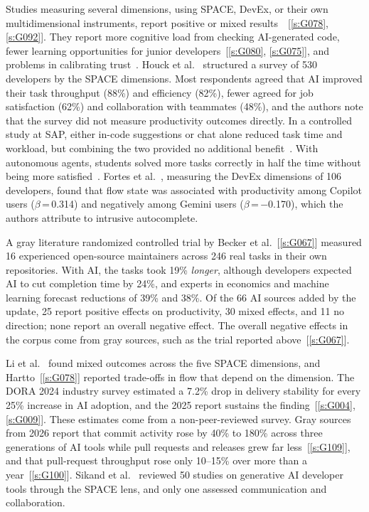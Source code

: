 \documentclass[preprint,number]{elsarticle}
\newcounter{study}
\newcommand{\refG}[1]{\ref{s:#1}}
\begin{document}
Studies measuring several dimensions, using SPACE, DevEx, or their own multidimensional instruments, report positive or mixed results~\cite{P0244, P1303, P1402, P2019, P2020, P2025}~[\refG{G078}, \refG{G092}]. They report more cognitive load from checking AI-generated code, fewer learning opportunities for junior developers~[\refG{G080}, \refG{G075}], and problems in calibrating trust~\cite{P1402}. Houck et al.~\cite{P2020} structured a survey of 530 developers by the SPACE dimensions. Most respondents agreed that AI improved their task throughput (88\%) and efficiency (82\%), fewer agreed for job satisfaction (62\%) and collaboration with teammates (48\%), and the authors note that the survey did not measure productivity outcomes directly. In a controlled study at SAP, either in-code suggestions or chat alone reduced task time and workload, but combining the two provided no additional benefit~\cite{P2019}. With autonomous agents, students solved more tasks correctly in half the time without being more satisfied~\cite{P2025}. Fortes et al.~\cite{P0244}, measuring the DevEx dimensions of 106 developers, found that flow state was associated with productivity among Copilot users ($\beta$\,=\,0.314) and negatively among Gemini users ($\beta$\,=\,$-$0.170), which the authors attribute to intrusive autocomplete.

A gray literature randomized controlled trial by Becker et al.~[\refG{G067}] measured 16 experienced open-source maintainers across 246 real tasks in their own repositories. With AI, the tasks took 19\% \textit{longer}, although developers expected AI to cut completion time by 24\%, and experts in economics and machine learning forecast reductions of 39\% and 38\%. Of the 66 AI sources added by the update, 25 report positive effects on productivity, 30 mixed effects, and 11 no direction; none report an overall negative effect. The overall negative effects in the corpus come from gray sources, such as the trial reported above~[\refG{G067}].

Li et al.~\cite{P1303} found mixed outcomes across the five SPACE dimensions, and Hartto~[\refG{G078}] reported trade-offs in flow that depend on the dimension. The DORA 2024 industry survey estimated a 7.2\% drop in delivery stability for every 25\% increase in AI adoption, and the 2025 report sustains the finding~[\refG{G004}, \refG{G009}]. These estimates come from a non-peer-reviewed survey. Gray sources from 2026 report that commit activity rose by 40\% to 180\% across three generations of AI tools while pull requests and releases grew far less~[\refG{G109}], and that pull-request throughput rose only 10--15\% over more than a year~[\refG{G100}]. Sikand et al.~\cite{P1816} reviewed 50 studies on generative AI developer tools through the SPACE lens, and only one assessed communication and collaboration.
\end{document}
